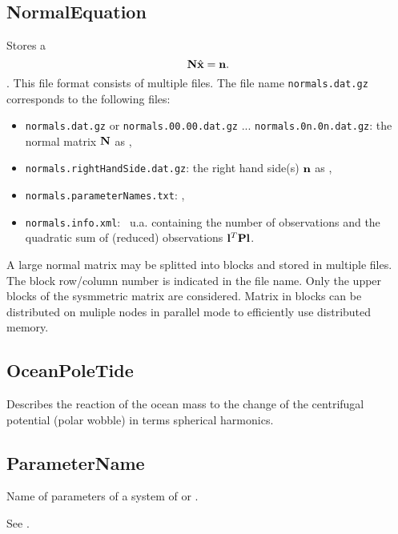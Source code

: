 \subsection{NormalEquation}\label{general.fileFormat:normalEquation}
Stores a 
\begin{equation}
  \mathbf{N} \hat{\mathbf{x}} = \mathbf{n}.
\end{equation}.
This file format consists of multiple files.
The file name \verb|normals.dat.gz| corresponds to the following files:
\begin{itemize}
\item \verb|normals.dat.gz| or \verb|normals.00.00.dat.gz| ... \verb|normals.0n.0n.dat.gz|:
      the normal matrix $\mathbf{N}$ as ,
\item \verb|normals.rightHandSide.dat.gz|:
      the right hand side(s) $\mathbf{n}$ as ,
\item \verb|normals.parameterNames.txt|: ,
\item \verb|normals.info.xml|:
\     u.a. containing the number of observations and the quadratic sum of (reduced) observations $\mathbf{l}^T\mathbf{P}\mathbf{l}$.
\end{itemize}
A large normal matrix may be splitted into blocks and stored in multiple files.
The block row/column number is indicated in the file name.
Only the upper blocks of the sysmmetric matrix are considered.
Matrix in blocks can be distributed on muliple nodes in parallel mode to efficiently use distributed memory.


\subsection{OceanPoleTide}\label{general.fileFormat:oceanPoleTide}
Describes the reaction of the ocean mass to the change
of the centrifugal potential (polar wobble) in terms spherical harmonics.


\subsection{ParameterName}\label{general.fileFormat:parameterName}
Name of parameters of a system of  or .

See .

